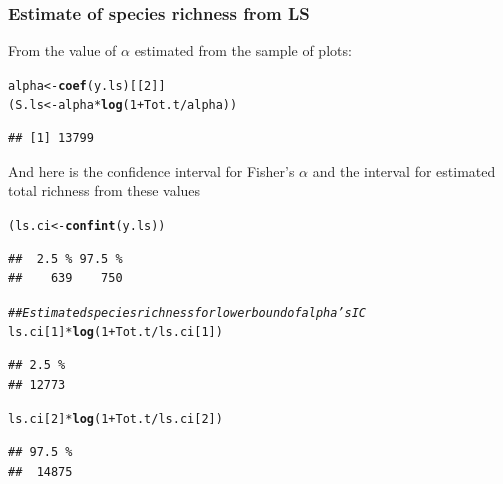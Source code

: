 \documentclass[12pt, A4]{article}\usepackage[]{graphicx}\usepackage[]{color}
\makeatletter
\newcommand{\hlnum}[1]{\textcolor[rgb]{0.686,0.059,0.569}{#1}}%
\newcommand{\hlcom}[1]{\textcolor[rgb]{0.678,0.584,0.686}{\textit{#1}}}%
\newcommand{\hlopt}[1]{\textcolor[rgb]{0,0,0}{#1}}%
\newcommand{\hlstd}[1]{\textcolor[rgb]{0.345,0.345,0.345}{#1}}%
\newcommand{\hlkwb}[1]{\textcolor[rgb]{0.69,0.353,0.396}{#1}}%
\newcommand{\hlkwd}[1]{\textcolor[rgb]{0.737,0.353,0.396}{\textbf{#1}}}%
\newenvironment{kframe}{%
 \def\at@end@of@kframe{}%
 \ifinner\ifhmode%
  \def\at@end@of@kframe{\end{minipage}}%
  \begin{minipage}{\columnwidth}%
 \fi\fi%
 \def\FrameCommand##1{\hskip\@totalleftmargin \hskip-\fboxsep
 \colorbox{shadecolor}{##1}\hskip-\fboxsep
     \hskip-\linewidth \hskip-\@totalleftmargin \hskip\columnwidth}%
 \MakeFramed {\advance\hsize-\width
   \@totalleftmargin\z@ \linewidth\hsize
   \@setminipage}}%
 {\par\unskip\endMakeFramed%
 \at@end@of@kframe}
\newenvironment{knitrout}{}{} %
\makeatother
\begin{document}
\subsubsection*{Estimate of species richness from LS}

From the value of $\alpha$ estimated from the sample of plots:
 
\begin{knitrout}
\color{fgcolor}\begin{kframe}
\begin{alltt}
\hlstd{alpha} \hlkwb{<-} \hlkwd{coef}\hlstd{(y.ls)[[}\hlnum{2}\hlstd{]]}
\hlstd{(S.ls} \hlkwb{<-} \hlstd{alpha}\hlopt{*}\hlkwd{log}\hlstd{(}\hlnum{1} \hlopt{+} \hlstd{Tot.t}\hlopt{/}\hlstd{alpha))}
\end{alltt}
\begin{verbatim}
## [1] 13799
\end{verbatim}
\end{kframe}
\end{knitrout}

And here is the confidence interval for Fisher's $\alpha$ and the
interval for estimated total richness from these values

\begin{knitrout}
\color{fgcolor}\begin{kframe}
\begin{alltt}
\hlstd{(ls.ci} \hlkwb{<-} \hlkwd{confint}\hlstd{(y.ls))}
\end{alltt}
\begin{verbatim}
##  2.5 % 97.5 % 
##    639    750
\end{verbatim}
\begin{alltt}
\hlcom{## Estimated species richness for lower bound of alpha's IC}
\hlstd{ls.ci[}\hlnum{1}\hlstd{]}\hlopt{*}\hlkwd{log}\hlstd{(}\hlnum{1} \hlopt{+} \hlstd{Tot.t}\hlopt{/}\hlstd{ls.ci[}\hlnum{1}\hlstd{])}
\end{alltt}
\begin{verbatim}
## 2.5 % 
## 12773
\end{verbatim}
\begin{alltt}
\hlstd{ls.ci[}\hlnum{2}\hlstd{]}\hlopt{*}\hlkwd{log}\hlstd{(}\hlnum{1} \hlopt{+} \hlstd{Tot.t}\hlopt{/}\hlstd{ls.ci[}\hlnum{2}\hlstd{])}
\end{alltt}
\begin{verbatim}
## 97.5 % 
##  14875
\end{verbatim}
\end{kframe}
\end{knitrout}
\end{document}
